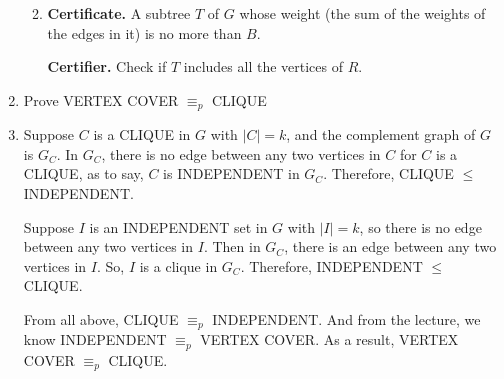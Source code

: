 \documentclass[12pt,a4paper]{article}
\makeatletter
\newtheorem*{solution}{Solution}
\theoremstyle{definition}
\renewenvironment{solution}[1][Solution] {\par\pushQED{\qed}\normalfont\topsep6\p@\@plus6\p@\relax\trivlist\item[\hskip\labelsep\bfseries#1\@addpunct{.}]\ignorespaces}{\popQED\endtrivlist\@endpefalse} \makeatother
\makeatother
\begin{document}
\begin{enumerate}
\begin{enumerate}
	\begin{solution}\quad
		
		\textbf{Certificate.} A subtree $T$ of $G$ whose weight (the sum of the weights of the edges in it) is no more than $B$.
		
		\textbf{Certifier.} Check if $T$ includes all the vertices of $R$.
		
	\end{solution}
	
\end{enumerate}

\item Prove VERTEX COVER $\equiv_p$ CLIQUE

\begin{solution}
	Suppose $C$ is a CLIQUE in $G$ with $|C| = k$, and the complement graph of $G$ is $G_C$. In $G_C$, there is no edge between any two vertices in $C$ for $C$ is a CLIQUE, as to say, $C$ is INDEPENDENT in $G_C$. Therefore, CLIQUE $\leq$ INDEPENDENT.
	
	Suppose $I$ is an INDEPENDENT set in $G$ with $|I| = k$, so there is no edge between any two vertices in $I$. Then in $G_C$, there is an edge between any two vertices in $I$. So, $I$ is a clique in $G_C$. Therefore, INDEPENDENT $\leq$ CLIQUE.
	
	From all above, CLIQUE $\equiv_p$ INDEPENDENT. And from the lecture, we know INDEPENDENT $\equiv_p$ VERTEX COVER. As a result, VERTEX COVER $\equiv_p$ CLIQUE.
	
\end{solution}

\end{enumerate}


\end{document}
